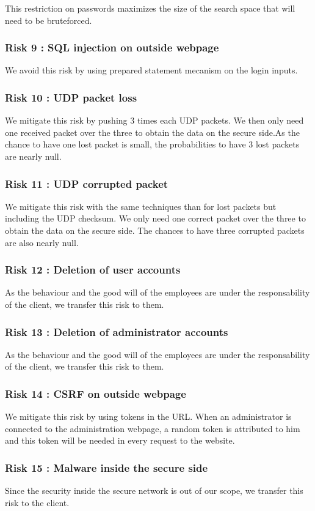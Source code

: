 \documentclass[a4paper,11pt]{article}
\begin{document}
This restriction on passwords maximizes the size of the search space that will need to be bruteforced.

\subsubsection{Risk 9 : SQL injection on outside webpage}
We avoid this risk by using prepared statement mecanism on the login inputs.
\subsubsection{Risk 10 : UDP packet loss}
We mitigate this risk by pushing 3 times each UDP packets. We then only need one received packet over the three to obtain the data on the secure side.As the chance to have one lost packet is small, the probabilities to have 3 lost packets are nearly null.
\subsubsection{Risk 11 : UDP corrupted packet}
We mitigate this risk with the same techniques than for lost packets but including the UDP checksum. We only need one correct packet over the three to obtain the data on the secure side. The chances to have three corrupted packets are also nearly null.
\subsubsection{Risk 12 : Deletion of user accounts}
As the behaviour and the good will of the employees are under the responsability of the client, we transfer this risk to them.
\subsubsection{Risk 13 : Deletion of administrator accounts}
As the behaviour and the good will of the employees are under the responsability of the client, we transfer this risk to them.
\subsubsection{Risk 14 : CSRF on outside webpage}
We mitigate this risk by using tokens in the URL. When an administrator is connected to the administration webpage, a random token is attributed to him and this token will be needed in every request to the website.
\subsubsection{Risk 15 : Malware inside the secure side}
Since the security inside the secure network is out of our scope, we transfer this risk to the client.
\end{document}
